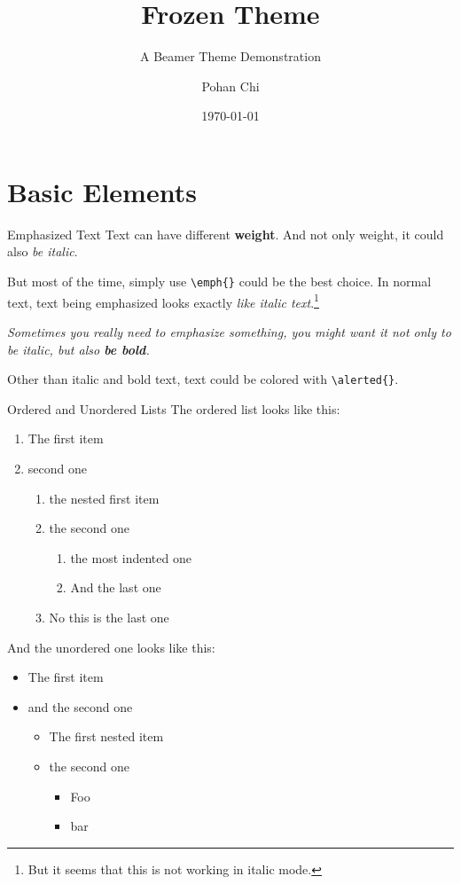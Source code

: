 \documentclass[10pt]{beamer}
\title{Frozen Theme}
\subtitle{A Beamer Theme Demonstration}
\author{Pohan Chi}
\date{\today}
\begin{document}
\maketitle

\maketoc

\section{Basic Elements}

\begin{frame}{Emphasized Text}
  Text can have different \textbf{weight}.
  And not only weight, it could also \textit{be italic}.

  But most of the time, simply use \texttt{\textbackslash{}emph\{\}} could be the best choice.
  In normal text, text being emphasized looks exactly \emph{like italic text}.\footnote{But it seems that this is not working in italic mode.}

  \textit{Sometimes you really need to emphasize something, you might want it not only to be italic, but also \textbf{be bold}.}

  Other than italic and bold text, text could \alert{be colored} with \texttt{\textbackslash{}alerted\{\}}.
\end{frame}

\begin{frame}{Ordered and Unordered Lists}
  The ordered list looks like this:
  \begin{enumerate}
    \item The first item
    \item second one
          \begin{enumerate}
            \item the nested first item
            \item the second one
                  \begin{enumerate}
                    \item the most indented one
                    \item And the last one
                  \end{enumerate}
            \item No this is the last one
          \end{enumerate}
  \end{enumerate}

  And the unordered one looks like this:
  \begin{itemize}
    \item The first item
    \item and the second one
          \begin{itemize}
            \item The first nested item
            \item the second one
                  \begin{itemize}
                    \item Foo
                    \item bar
                  \end{itemize}
          \end{itemize}
  \end{itemize}
\end{frame}
\end{document}
